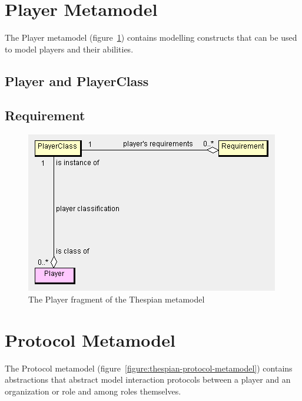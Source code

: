 \section{Player Metamodel}

The Player metamodel (figure~\ref{figure:thespian-player-metamodel}) contains modelling constructs that can be used to model players and their abilities.

\subsection*{Player and PlayerClass}

\subsection*{Requirement}

\begin{figure}[ht]
	\centering
	\includegraphics[width=\textwidth]{images/thespian-player-metamodel.png}
	\caption{The Player fragment of the Thespian metamodel}
	\label{figure:thespian-player-metamodel}
\end{figure}

\section{Protocol Metamodel}

The Protocol metamodel (figure~\ref{figure:thespian-protocol-metamodel}) contains abstractions that abstract model interaction protocols between a player and an organization or role and among roles themselves.

